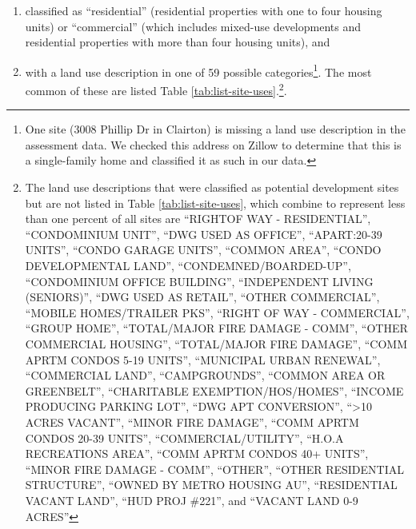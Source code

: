\documentclass[
]{book}
\begin{document}
\begin{enumerate}
\def\labelenumi{\arabic{enumi}.}
\item
  classified as ``residential'' (residential properties with one to
  four housing units) or ``commercial'' (which includes mixed-use developments
  and residential properties with more than four housing units), and
\item
  with a land use description in one of 59 possible categories\footnote{One site (3008
    Phillip Dr in Clairton) is missing a land use description in the assessment data.
    We checked this address on Zillow to determine that this is a single-family home
    and classified it as such in our data.}. The most common of these are listed Table \ref{tab:list-site-uses}.\footnote{The land use descriptions that were
    classified as potential development sites but are not listed in Table
    \ref{tab:list-site-uses}, which combine to represent less than one percent of all sites
    are ``RIGHTOF WAY - RESIDENTIAL'', ``CONDOMINIUM UNIT'', ``DWG USED AS OFFICE'',
    ``APART:20-39 UNITS'', ``CONDO GARAGE UNITS'', ``COMMON AREA'', ``CONDO DEVELOPMENTAL
    LAND'', ``CONDEMNED/BOARDED-UP'', ``CONDOMINIUM OFFICE BUILDING'', ``INDEPENDENT LIVING
    (SENIORS)'', ``DWG USED AS RETAIL'', ``OTHER COMMERCIAL'', ``MOBILE HOMES/TRAILER PKS'',
    ``RIGHT OF WAY - COMMERCIAL'', ``GROUP HOME'', ``TOTAL/MAJOR FIRE DAMAGE - COMM'',
    ``OTHER COMMERCIAL HOUSING'', ``TOTAL/MAJOR FIRE DAMAGE'', ``COMM APRTM CONDOS 5-19
    UNITS'', ``MUNICIPAL URBAN RENEWAL'', ``COMMERCIAL LAND'', ``CAMPGROUNDS'', ``COMMON AREA
    OR GREENBELT'', ``CHARITABLE EXEMPTION/HOS/HOMES'', ``INCOME PRODUCING PARKING LOT'',
    ``DWG APT CONVERSION'', ``\textgreater10 ACRES VACANT'', ``MINOR FIRE DAMAGE'', ``COMM APRTM CONDOS
    20-39 UNITS'', ``COMMERCIAL/UTILITY'',
    ``H.O.A RECREATIONS AREA'', ``COMM APRTM CONDOS 40+ UNITS'', ``MINOR FIRE DAMAGE - COMM'',
    ``OTHER'', ``OTHER RESIDENTIAL STRUCTURE'', ``OWNED BY METRO HOUSING AU'', ``RESIDENTIAL VACANT
    LAND'', ``HUD PROJ \#221'', and ``VACANT LAND 0-9 ACRES''}.
\end{enumerate}
\end{document}
